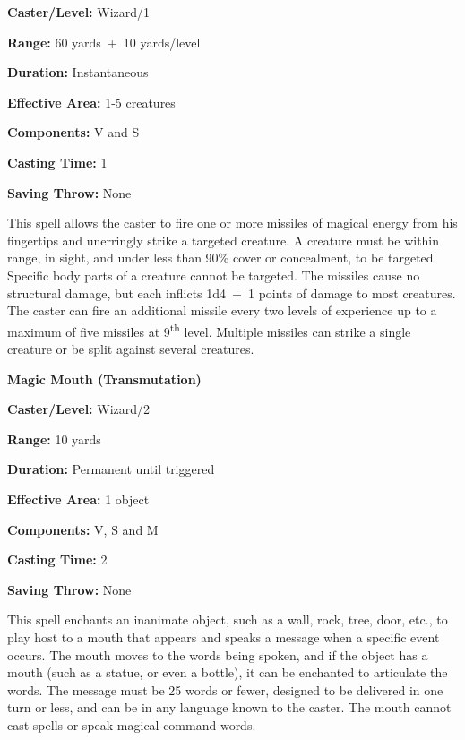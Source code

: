 \begin{multicols}{2}
\begin{minipage}{\columnwidth}
\noindent \textbf{Caster/Level:} Wizard/1

\noindent \textbf{Range:} 60 yards~+~10 yards/level

\noindent \textbf{Duration:} Instantaneous

\noindent \textbf{Effective Area:} 1-5 creatures

\noindent \textbf{Components:} V and S

\noindent \textbf{Casting Time:} 1

\noindent \textbf{Saving Throw:} None

\end{minipage}

This spell allows the caster to fire one or more missiles of magical energy from his fingertips and unerringly strike a targeted creature.  A creature must be within range, in sight, and under less than 90\% cover or concealment, to be targeted.  Specific body parts of a creature cannot be targeted.  The missiles cause no structural damage, but each inflicts 1d4~+~1 points of damage to most creatures.  The caster can fire an additional missile every two levels of experience up to a maximum of five missiles at 9\textsuperscript{th} level.  Multiple missiles can strike a single creature or be split against several creatures.

\vspace{1em}

\noindent
\begin{minipage}{\columnwidth}

\noindent \textbf{Magic Mouth (Transmutation)}

\noindent \textbf{Caster/Level:} Wizard/2

\noindent \textbf{Range:} 10 yards

\noindent \textbf{Duration:} Permanent until triggered

\noindent \textbf{Effective Area:} 1 object

\noindent \textbf{Components:} V, S and M

\noindent \textbf{Casting Time:} 2

\noindent \textbf{Saving Throw:} None

\end{minipage}

This spell enchants an inanimate object, such as a wall, rock, tree, door, etc., to play host to a mouth that appears and speaks a message when a specific event occurs.  The mouth moves to the words being spoken, and if the object has a mouth (such as a statue, or even a bottle), it can be enchanted to articulate the words.  The message must be 25 words or fewer, designed to be delivered in one turn or less, and can be in any language known to the caster.  The mouth cannot cast spells or speak magical command words.


\end{multicols}
